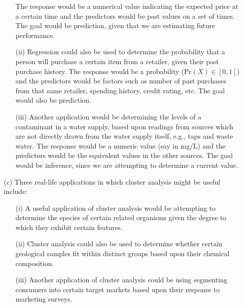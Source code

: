 \begin{itemize}
\begin{itemize}
                The response
                would be a numerical value indicating the expected price at a
                certain time
                and the predictors would be past values on a set of times.
                The goal would
                be prediction, given that we are estimating future performance.
            \item[(ii)] Regression could also be used to determine the
                probability that
                a person will purchase a certain item from a retailer, given their past
                purchase history. The response would be a probability
                ($\text{Pr}(X) \in [0, 1]$) and the predictors would be factors such as
                number of past purchases from that same retailer, spending
                history, credit
                rating, etc. The goal would also be prediction.
            \item[(iii)] Another application would be determining the levels of a
                contaminant in a water supply, based upon readings from
                sources which are
                not directly drawn from the water supply itself, e.g., taps
                and waste water.
                The response would be a numeric value (say in mg/L) and the
                predictors would
                be the equivalent values in the other sources. The goal would
                be inference,
                since we are attempting to determine a current value.
        \end{itemize}
    \item[(c)] Three real-life applications in which cluster analysis might be
        useful include:
        \begin{itemize}
            \item[(i)] A useful application of cluster analysis would be attempting
                to determine the species of certain related organisms given
                the degree to
                which they exhibit certain features.
            \item[(ii)] Cluster analysis could also be used to determine
                whether certain
                geological samples fit within distinct groups based upon their chemical
                composition.
            \item[(iii)] Another application of cluster analysis could be using
                segmenting consumers into certain target markets based upon
                their response
                to marketing surveys.
        \end{itemize}
\end{itemize}

